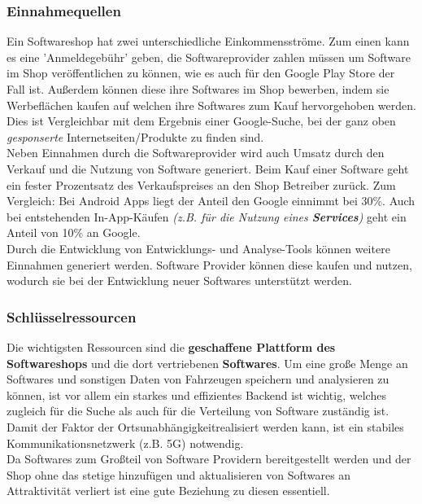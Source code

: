 \subsubsection{Einnahmequellen}
Ein Softwareshop hat zwei unterschiedliche Einkommensströme. Zum einen kann es eine 'Anmeldegebühr' geben, die Softwareprovider zahlen müssen um Software im Shop veröffentlichen zu können, wie es auch für den Google Play Store der Fall ist. Außerdem können diese ihre Softwares im Shop bewerben, indem sie Werbeflächen kaufen auf welchen ihre Softwares zum Kauf hervorgehoben werden. Dies ist Vergleichbar mit dem Ergebnis einer Google-Suche, bei der ganz oben \textit{gesponserte} Internetseiten/Produkte zu finden sind.\\
Neben Einnahmen durch die Softwareprovider wird auch Umsatz durch den Verkauf und die Nutzung von Software generiert. Beim Kauf einer Software geht ein fester Prozentsatz des Verkaufspreises an den Shop Betreiber zurück. Zum Vergleich: Bei Android Apps liegt der Anteil den Google einnimmt bei 30\%. Auch bei entstehenden In-App-Käufen \textit{(z.B. für die Nutzung eines \textbf{Services})} geht ein Anteil von 10\% an Google.\\
Durch die Entwicklung von Entwicklungs- und Analyse-Tools können weitere Einnahmen generiert werden. Software Provider können diese kaufen und nutzen, wodurch sie bei der Entwicklung neuer Softwares unterstützt werden.

\subsubsection{Schlüsselressourcen}
Die wichtigsten Ressourcen sind die \textbf{geschaffene Plattform des Softwareshops} und die dort vertriebenen \textbf{Softwares}. Um eine große Menge an Softwares und sonstigen Daten von Fahrzeugen speichern und analysieren zu können, ist vor allem ein starkes und effizientes Backend ist wichtig, welches zugleich für die Suche als auch für die Verteilung von Software zuständig ist. Damit der Faktor der Ortsunabhängigkeitrealisiert werden kann, ist ein stabiles Kommunikationsnetzwerk (z.B. 5G\cite[S. 10]{vda}) notwendig. \\
Da Softwares zum Großteil von Software Providern bereitgestellt werden und der Shop ohne das stetige hinzufügen und aktualisieren von Softwares an Attraktivität verliert ist eine gute Beziehung zu diesen essentiell.
